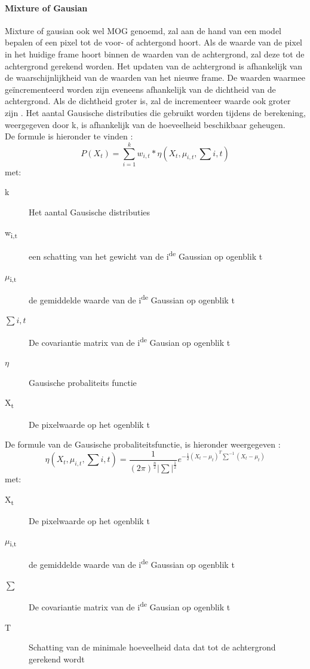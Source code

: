 \paragraph{Mixture of Gausian}
\label{refMOG}
Mixture of gausian ook wel MOG genoemd, zal aan de hand van een model bepalen of een pixel tot de voor- of achtergond hoort. Als de waarde van de pixel in het huidige frame hoort binnen de waarden van de achtergrond, zal deze tot de achtergrond gerekend worden. Het updaten van de achtergrond is afhankelijk van de waarschijnlijkheid van de waarden van het nieuwe frame. De waarden waarmee ge\"incrementeerd worden zijn eveneens afhankelijk van de dichtheid van de achtergrond. Als de dichtheid groter is, zal de incrementeer waarde ook groter zijn \cite{bibSDB}. Het aantal Gausische distributies die gebruikt worden tijdens de berekening, weergegeven door k, is afhankelijk van de hoeveelheid beschikbaar geheugen. \\
De formule is hieronder te vinden \cite{bibMOG}:
\begin{displaymath}
	P(X_{t}) = \sum_{i=1}^{k} w_{i,t} * \eta (X_{t},\mu_{i,t},\sum{i,t})
\end{displaymath}
met:
\begin{description}
	\item[k] Het aantal Gausische distributies	
	\item[w\textsubscript{i,t}] een schatting van het gewicht van de i\textsuperscript{de} Gaussian op ogenblik t
	\item[$\mu$\textsubscript{i,t}] de gemiddelde waarde van de i\textsuperscript{de} Gaussian op ogenblik t
	\item[$\sum{i,t}$] De covariantie matrix van de i\textsuperscript{de} Gausian op ogenblik t
	\item[$\eta$] Gausische probaliteits functie
	\item[X\textsubscript{t}] De pixelwaarde op het ogenblik t
\end{description}
De formule van de Gausische probaliteitsfunctie, is hieronder weergegeven \cite{bibMOG}:
\begin{displaymath}
\eta (X_{t},\mu_{i,t},\sum{i,t}) = \frac{1}{(2\pi)^{\frac{n}{2}}|\sum|^{\frac{1}{2}}}e^{-\frac{1}{2}(X_t-\mu_t)^T\sum^{-1}(X_t-\mu_t)}
	\end{displaymath}
	met:
	\begin{description}
		\item[X\textsubscript{t}] De pixelwaarde op het ogenblik t
		\item[$\mu$\textsubscript{i,t}] de gemiddelde waarde van de i\textsuperscript{de} Gaussian op ogenblik t
		\item[$\sum$] De covariantie matrix van de i\textsuperscript{de} Gausian op ogenblik t
		\item[T] Schatting van de minimale hoeveelheid data dat tot de achtergrond gerekend wordt
	\end{description}
